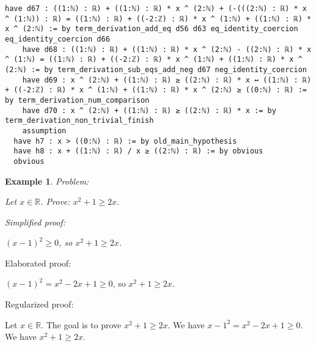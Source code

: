 \documentclass{article}
\newtheorem{example}{Example}
\begin{document}
\begin{tcolorbox}[colback=white!10, width=\linewidth]
\begin{lstlisting}[language=Lean4]
    have d67 : ((1:ℕ) : ℝ) + ((1:ℕ) : ℝ) * x ^ (2:ℕ) + (-(((2:ℕ) : ℝ) * x ^ (1:ℕ)) : ℝ) = ((1:ℕ) : ℝ) + ((-2:ℤ) : ℝ) * x ^ (1:ℕ) + ((1:ℕ) : ℝ) * x ^ (2:ℕ) := by term_derivation_add_eq d56 d63 eq_identity_coercion eq_identity_coercion d66
    have d68 : ((1:ℕ) : ℝ) + ((1:ℕ) : ℝ) * x ^ (2:ℕ) - ((2:ℕ) : ℝ) * x ^ (1:ℕ) = ((1:ℕ) : ℝ) + ((-2:ℤ) : ℝ) * x ^ (1:ℕ) + ((1:ℕ) : ℝ) * x ^ (2:ℕ) := by term_derivation_sub_eqs_add_neg d67 neg_identity_coercion
    have d69 : x ^ (2:ℕ) + ((1:ℕ) : ℝ) ≥ ((2:ℕ) : ℝ) * x ↔ ((1:ℕ) : ℝ) + ((-2:ℤ) : ℝ) * x ^ (1:ℕ) + ((1:ℕ) : ℝ) * x ^ (2:ℕ) ≥ ((0:ℕ) : ℝ) := by term_derivation_num_comparison
    have d70 : x ^ (2:ℕ) + ((1:ℕ) : ℝ) ≥ ((2:ℕ) : ℝ) * x := by term_derivation_non_trivial_finish
    assumption
  have h7 : x > ((0:ℕ) : ℝ) := by old_main_hypothesis
  have h8 : x + ((1:ℕ) : ℝ) / x ≥ ((2:ℕ) : ℝ) := by obvious
  obvious

\end{lstlisting}
\end{tcolorbox}


\begin{example}
Problem:
\begin{tcolorbox}[colback=yellow!10, width=\linewidth]
Let $x\in\mathbb{R}$. Prove: $x^2 + 1\ge 2x$.
\end{tcolorbox}

Simplified proof:
\begin{tcolorbox}[colback=blue!10, width=\linewidth]
$(x-1)^2 \ge 0$, so $x^2 + 1 \ge 2x$.
\end{tcolorbox}
\end{example}

Elaborated proof:
\begin{tcolorbox}[colback=green!10, width=\linewidth]
$(x-1)^2 = x^2 - 2x + 1 \ge 0$, so $x^2 + 1 \ge 2x$.
\end{tcolorbox}

Regularized proof:
\begin{tcolorbox}[colback=red!10, width=\linewidth]
Let $x\in\mathbb{R}$.
The goal is to prove $x^2 + 1 \ge 2x$.
We have ${{x-1}}^2 = x^2 - 2x + 1 \ge 0$.
We have $x^2 + 1 \ge 2x$.
\end{tcolorbox}
\end{document}
